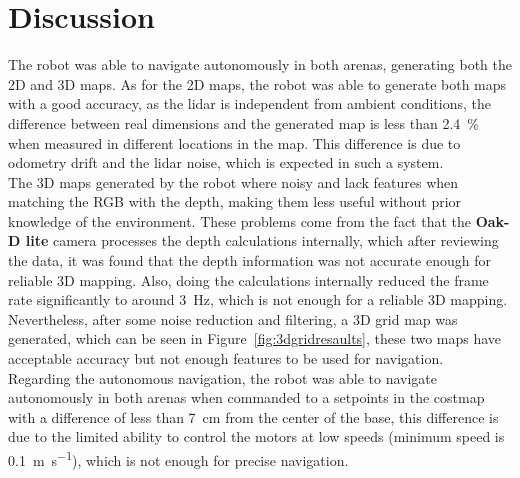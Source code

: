 \section{Discussion}
\label{sec:discussion}

The robot was able to navigate autonomously in both arenas, generating both the 2D and 3D maps. As for the 2D maps, the robot was able to generate both maps with a good accuracy, as the \gls{lidar} is independent from ambient conditions, the difference between real dimensions and the generated map is less than \SI{2.4}{\percent} when measured in different locations in the map. This difference is due to odometry drift and the \gls{lidar} noise, which is expected in such a system.\\
The 3D maps generated by the robot where noisy and lack features when matching the RGB with the depth, making them less useful without prior knowledge of the environment. These problems come from the fact that the \textbf{Oak-D lite} camera processes the depth calculations internally, which after reviewing the data, it was found that the depth information was not accurate enough for reliable 3D mapping. Also, doing the calculations internally reduced the frame rate significantly to around \SI{3}{\hertz}, which is not enough for a reliable 3D mapping.
Nevertheless, after some noise reduction and filtering, a 3D grid map was generated, which can be seen in Figure~\ref{fig:3dgridresaults}, these two maps have acceptable accuracy but not enough features to be used for navigation.\\
Regarding the autonomous navigation, the robot was able to navigate autonomously in both arenas when commanded to a setpoints in the costmap with a difference of less than \SI{7}{\centi\meter} from the center of the base, this difference is due to the limited ability to control the motors at low speeds (minimum speed is \SI[per-mode=fraction,fraction-function=\tfrac]{0.1}{\metre\per\second}), which is not enough for precise navigation.

